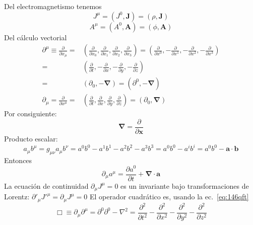 Del electromagnetismo tenemos
\begin{equation}
  \label{eq:cv_jmu}
  J^\mu=(J^0,\mathbf{J})=(\rho,\mathbf{J})
\end{equation}
\begin{equation}
  \label{eq:cv_phia}
  A^\mu=(A^0,\mathbf{A})=(\phi,\mathbf{A})
\end{equation}
Del cálculo vectorial
\begin{align}
\label{eq:171qft}
  \partial^\mu\equiv\frac{\partial}{\partial x_\mu}=&
  \left(
    \frac{\partial}{\partial x_0},\frac{\partial}{\partial x_1},\frac{\partial}{\partial x_2},\frac{\partial}{\partial x_3}
  \right)=\left(
    \frac{\partial}{\partial x^0},-\frac{\partial}{\partial x^1},-\frac{\partial}{\partial x^2},-\frac{\partial}{\partial x^3}
  \right)\nonumber\\
  =&\left(
    \frac{\partial}{\partial t},-\frac{\partial}{\partial x},-\frac{\partial}{\partial y},-\frac{\partial}{\partial z}
  \right)\nonumber\\
  =&(\partial_0,-\boldsymbol{\nabla})=(\partial^0,-\boldsymbol{\nabla})\\
  \partial_\mu=\frac{\partial}{\partial x^\mu}=&\left(
    \frac{\partial}{\partial t},\frac{\partial}{\partial x},\frac{\partial}{\partial y},\frac{\partial}{\partial z}
  \right)
  =(\partial_0,\boldsymbol{\nabla})
\end{align}
Por consiguiente:
\begin{equation}
  \label{eq:nabla}
  \boldsymbol{\nabla}=\frac{\partial}{\partial\mathbf{x}}
\end{equation}
Producto escalar:
\begin{equation}
  a_\mu b^\mu=g_{\mu\nu}a_\mu b^\nu=a^0b^0-a^1b^1-a^2b^2-a^3b^3=a^0b^0-a^i b^i=a^0b^0-\mathbf{a}\cdot \mathbf{b}
\end{equation}
Entonces
\begin{equation}
  \partial_\mu a^\mu=\frac{\partial a^0}{\partial t}+\boldsymbol{\nabla}\cdot\mathbf{a}
\end{equation}
La ecuación de continuidad $\partial_\mu J^\mu=0$ es un invariante bajo transformaciones de Lorentz: $\partial'_\mu{J'}^\mu=\partial_\mu{J}^\mu=0$
El operador cuadrático es, usando la ec.~\eqref{eq:146qft}
\begin{equation}
  \label{eq:dalambertian}
  \Box\equiv \partial_\mu\partial^\mu=\partial^0\partial^0-\nabla^2 =\frac{\partial^2}{\partial t^2}-\frac{\partial^2}{\partial x^2}-\frac{\partial^2}{\partial y^2}-\frac{\partial^2}{\partial z^2}
\end{equation}


